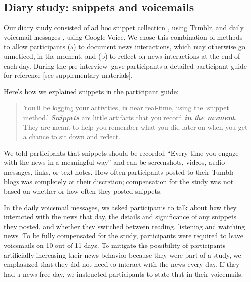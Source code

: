 \documentclass[sigchi]{acmart}
\begin{document}
\subsection{Diary study: snippets and voicemails}
Our diary study consisted of ad hoc snippet collection \cite{brandt2007txt}, using Tumblr, and daily voicemail messages \cite{palen2002voice}, using Google Voice. We chose this combination of methods to allow participants (a) to document news interactions, which may otherwise go unnoticed, in the moment, and (b) to reflect on news interactions at the end of each day. During the pre-interview, gave participants a detailed participant guide for reference [see supplementary materials]. 

Here’s how we explained snippets in the participant guide: 
\begin{quote}
You’ll be logging your activities, in near real-time, using the ‘snippet method.’ \textbf{\textit{Snippets}} are little artifacts that you record\textbf{\textit{ in the moment}}. They are meant to help you remember what you did later on when you get a chance to sit down and reflect. 
\end{quote}
We told participants that snippets should be recorded “Every time you engage with the news in a meaningful way” and can be screenshots, videos, audio messages, links, or text notes. How often participants posted to their Tumblr blogs was completely at their discretion; compensation for the study was not based on whether or how often they posted snippets.

In the daily voicemail messages, we asked participants to talk about how they interacted with the news that day, the details and significance of any snippets they posted, and whether they switched between reading, listening and watching news. To be fully compensated for the study, participants were required to leave voicemails on 10 out of 11 days. To mitigate the possibility of participants artificially increasing their news behavior because they were part of a study, we emphasized that they did  not need to interact with the news every day. If they had a news-free day, we instructed participants to state that in their voicemails.
\end{document}
